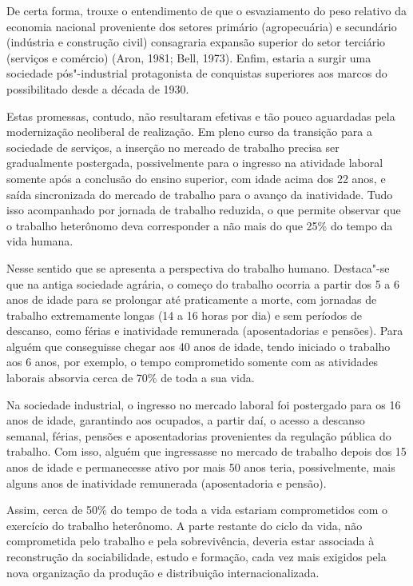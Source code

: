De certa forma, trouxe o entendimento de que o esvaziamento do peso
relativo da economia nacional proveniente dos setores primário
(agropecuária) e secundário (indústria e construção civil) consagraria
expansão superior do setor terciário (serviços e comércio) (Aron, 1981;
Bell, 1973). Enfim, estaria a surgir uma sociedade pós"-industrial
protagonista de conquistas superiores aos marcos do possibilitado desde
a década de 1930.

Estas promessas, contudo, não resultaram efetivas e tão pouco aguardadas
pela modernização neoliberal de realização. Em pleno curso da transição
para a sociedade de serviços, a inserção no mercado de trabalho precisa
ser gradualmente postergada, possivelmente para o ingresso na atividade
laboral somente após a conclusão do ensino superior, com idade acima dos
22 anos, e saída sincronizada do mercado de trabalho para o avanço da
inatividade. Tudo isso acompanhado por jornada de trabalho reduzida, o
que permite observar que o trabalho heterônomo deva corresponder a não
mais do que 25\% do tempo da vida humana.

Nesse sentido que se apresenta a perspectiva do trabalho humano.
Destaca"-se que na antiga sociedade agrária, o começo do trabalho ocorria
a partir dos 5 a 6 anos de idade para se prolongar até praticamente a
morte, com jornadas de trabalho extremamente longas (14 a 16 horas por
dia) e sem períodos de descanso, como férias e inatividade remunerada
(aposentadorias e pensões). Para alguém que conseguisse chegar aos 40
anos de idade, tendo iniciado o trabalho aos 6 anos, por exemplo, o
tempo comprometido somente com as atividades laborais absorvia cerca de
70\% de toda a sua vida.

Na sociedade industrial, o ingresso no mercado laboral foi postergado
para os 16 anos de idade, garantindo aos ocupados, a partir daí, o
acesso a descanso semanal, férias, pensões e aposentadorias provenientes
da regulação pública do trabalho. Com isso, alguém que ingressasse no
mercado de trabalho depois dos 15 anos de idade e permanecesse ativo por
mais 50 anos teria, possivelmente, mais alguns anos de inatividade
remunerada (aposentadoria e pensão).

Assim, cerca de 50\% do tempo de toda a vida estariam comprometidos com
o exercício do trabalho heterônomo. A parte restante do ciclo da vida,
não comprometida pelo trabalho e pela sobrevivência, deveria estar
associada à reconstrução da sociabilidade, estudo e formação, cada vez
mais exigidos pela nova organização da produção e distribuição
internacionalizada.


